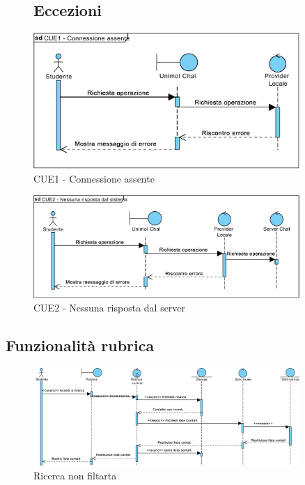 \begin{figure}
	\subsection{Eccezioni}
	\centering
	\includegraphics[width=0.9\textwidth]{imgs/gruppo6/sequence/CUE1_connessione_assente.pdf}
	\caption{CUE1 - Connessione assente}
	\label{fig:seq-cue1}
\end{figure}


\begin{figure}
	\centering
	\includegraphics[width=0.9\textwidth]{imgs/gruppo6/sequence/CUE2_nessuna_risposta_dal_server.pdf}
	\caption{CUE2 - Nessuna risposta dal server}
	\label{fig:seq-cue2}
\end{figure}

\clearpage
\subsection{Funzionalità rubrica}
\begin{figure}[H]
	\centering
	\includegraphics[width=0.9\textwidth]{imgs/gruppo5/sequence1.pdf}
	\caption{Ricerca non filtarta}
	\label{fig:seq1-rubrica}
\end{figure}

